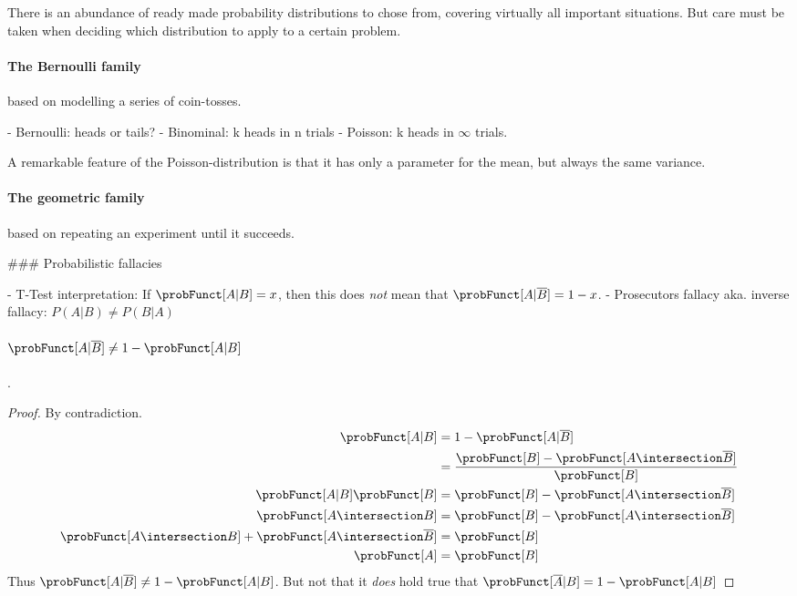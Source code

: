 There is an abundance of ready made probability distributions to chose from, covering virtually all important situations. But care must be taken when deciding which distribution to apply to a certain problem. 

\paragraph{The Bernoulli family} based on modelling a series of coin-tosses.

    - Bernoulli: heads or tails?
    - Binominal: k heads in n trials
    - Poisson: k heads in $\infty$ trials. 

A remarkable feature of the Poisson-distribution is that it has only a parameter for the mean, but always the same variance.

\paragraph{The geometric family} based on repeating an experiment until it succeeds. 



### Probabilistic fallacies

    - T-Test interpretation: If $\probFunct[A|B] = x$, then this does \emph{not} mean that $\probFunct[A|\overline{B}] = 1 - x$.
    - Prosecutors fallacy aka. inverse fallacy: $P(A|B) \neq P(B|A)$


\paragraph{$\probFunct[A|\overline{B}] \neq 1 - \probFunct[A | B]$}. 
\begin{proof}
    By contradiction. 
    \begin{equation}
        \begin{aligned}
           \probFunct[A|B]                 &= 1 - \probFunct[A | \overline{B}] \\
                                           &= \frac{  \probFunct[B] - \probFunct[A \intersection \overline{B}]  }{  \probFunct[B]  }  \\
           \probFunct[A|B] \probFunct[B]   &=         \probFunct[B] - \probFunct[A \intersection \overline{B}] \\
           \probFunct[A \intersection B]   &= \probFunct[B] - \probFunct[A \intersection \overline{B}] \\
           \probFunct[A \intersection B] + \probFunct[A \intersection \overline{B}]  &= \probFunct[B] \\
           \probFunct[A] &= \probFunct[B]
        \end{aligned}
    \end{equation}
    Thus $\probFunct[A|\overline{B}] \neq 1 - \probFunct[A | B]$. But not that it \emph{does} hold true that $\probFunct[\overline{A}|B] = 1 - \probFunct[A | B]$
\end{proof}

